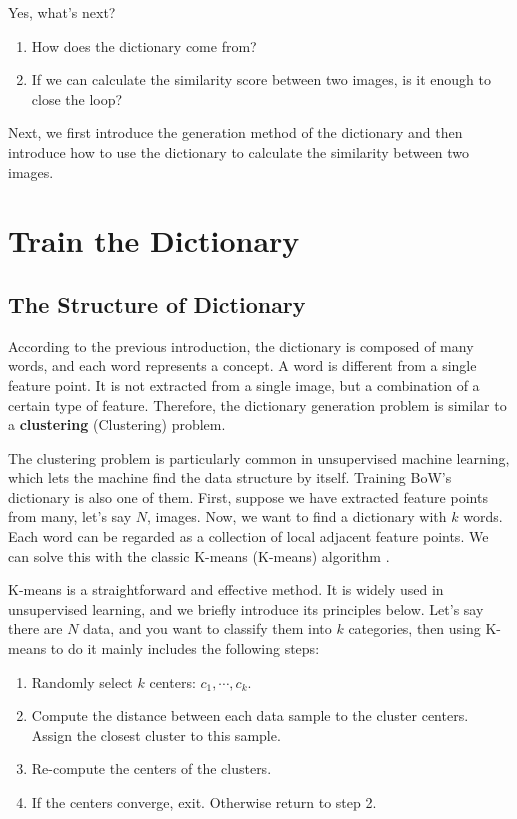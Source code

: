 Yes, what's next?
\begin{enumerate}
	\item How does the dictionary come from?
	\item If we can calculate the similarity score between two images, is it enough to close the loop?
\end{enumerate}

Next, we first introduce the generation method of the dictionary and then introduce how to use the dictionary to calculate the similarity between two images.

\section{Train the Dictionary}
\subsection{The Structure of Dictionary}
According to the previous introduction, the dictionary is composed of many words, and each word represents a concept. A word is different from a single feature point. It is not extracted from a single image, but a combination of a certain type of feature. Therefore, the dictionary generation problem is similar to a \textbf{clustering} (Clustering) problem.

The clustering problem is particularly common in unsupervised machine learning, which lets the machine find the data structure by itself. Training BoW's dictionary is also one of them. First, suppose we have extracted feature points from many, let's say $N$, images. Now, we want to find a dictionary with $k$ words. Each word can be regarded as a collection of local adjacent feature points. We can solve this with the classic K-means (K-means) algorithm {\cite{Lloyd1982}}.

K-means is a straightforward and effective method. It is widely used in unsupervised learning, and we briefly introduce its principles below. Let's say there are $N$ data, and you want to classify them into $k$ categories, then using K-means to do it mainly includes the following steps:

\begin{mdframed}
	\begin{enumerate}
		\item Randomly select $k$ centers: $c_1, \cdots, c_k$.
		\item Compute the distance between each data sample to the cluster centers. Assign the closest cluster to this sample. 
		\item Re-compute the centers of the clusters. 
		\item If the centers converge, exit. Otherwise return to step 2. 
	\end{enumerate}
\end{mdframed}

